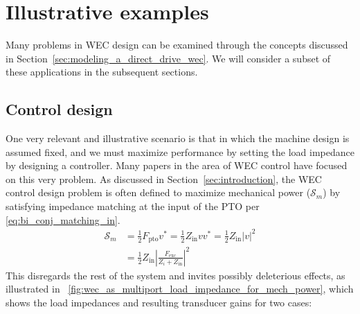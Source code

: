 \documentclass[5p,times]{elsarticle}
\begin{document}
\section{Illustrative examples}\label{sec:illustrative_examples}
Many problems in WEC design can be examined through the concepts discussed in Section~\ref{sec:modeling_a_direct_drive_wec}.
We will consider a subset of these applications in the subsequent sections.%

\subsection{Control design}\label{sec:control_design}
One very relevant and illustrative scenario is that in which the machine design is assumed fixed, and we must maximize performance by setting the load impedance by designing a controller.
Many papers in the area of WEC control have focused on this very problem.
As discussed in Section~\ref{sec:introduction}, the WEC control design problem is often defined to maximize mechanical power ($\mathcal{S}_{m}$) by satisfying impedance matching at the input of the PTO per \eqref{eq:bi_conj_matching_in}.
%
\begin{equation}
\begin{aligned}
        \mathcal{S}_{m}  &= \frac{1}{2} F_{\textrm{pto}} v^*  = \frac{1}{2}Z_{\textrm{in}} v v^* = \frac{1}{2}Z_{\textrm{in}} | v |^2 \\
        &= \frac{1}{2} Z_{\textrm{in}} \left| \frac{F_{\textrm{exc}}}{Z_i + Z_{\textrm{in}}} \right|^2
\end{aligned}
\end{equation}
%
This disregards the rest of the system and invites possibly deleterious effects, as illustrated in \figurename~\ref{fig:wec_as_multiport_load_impedance_for_mech_power}, which shows the load impedances and resulting transducer gains for two cases:
\end{document}
